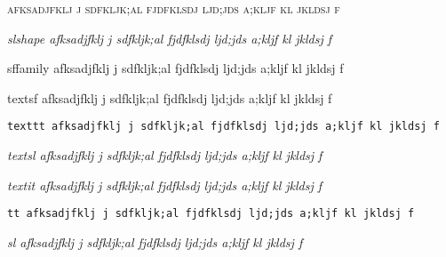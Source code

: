 \documentclass[12pt]{article}
\begin{document}
{\scshape
afksadjfklj j sdfkljk;al fjdfklsdj ljd;jds a;kljf kl jkldsj f}

{\slshape slshape
afksadjfklj j sdfkljk;al fjdfklsdj ljd;jds a;kljf kl jkldsj f}


{\sffamily sffamily
afksadjfklj j sdfkljk;al fjdfklsdj ljd;jds a;kljf kl jkldsj f}

\textsf{textsf
afksadjfklj j sdfkljk;al fjdfklsdj ljd;jds a;kljf kl jkldsj f}

\texttt{texttt
afksadjfklj j sdfkljk;al fjdfklsdj ljd;jds a;kljf kl jkldsj f}

\textsl{textsl
afksadjfklj j sdfkljk;al fjdfklsdj ljd;jds a;kljf kl jkldsj f}

\textit{textit
afksadjfklj j sdfkljk;al fjdfklsdj ljd;jds a;kljf kl jkldsj f}

{\tt tt
afksadjfklj j sdfkljk;al fjdfklsdj ljd;jds a;kljf kl jkldsj f}

{\sl sl
afksadjfklj j sdfkljk;al fjdfklsdj ljd;jds a;kljf kl jkldsj f}
\end{document}

